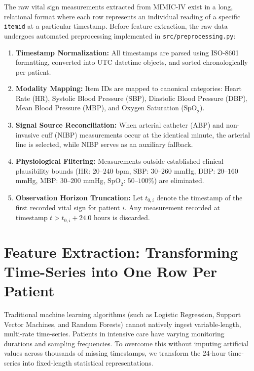 \documentclass[12pt,a4paper,oneside]{report}
\begin{document}
The raw vital sign measurements extracted from MIMIC-IV exist in a long, relational format where each row represents an individual reading of a specific \texttt{itemid} at a particular timestamp. Before feature extraction, the raw data undergoes automated preprocessing implemented in \texttt{src/preprocessing.py}:

\begin{enumerate}
    \item \textbf{Timestamp Normalization:} All timestamps are parsed using ISO-8601 formatting, converted into UTC datetime objects, and sorted chronologically per patient.
    \item \textbf{Modality Mapping:} Item IDs are mapped to canonical categories: Heart Rate (HR), Systolic Blood Pressure (SBP), Diastolic Blood Pressure (DBP), Mean Blood Pressure (MBP), and Oxygen Saturation ($\text{SpO}_2$).
    \item \textbf{Signal Source Reconciliation:} When arterial catheter (ABP) and non-invasive cuff (NIBP) measurements occur at the identical minute, the arterial line is selected, while NIBP serves as an auxiliary fallback.
    \item \textbf{Physiological Filtering:} Measurements outside established clinical plausibility bounds (HR: $20$--$240$ bpm, SBP: $30$--$260$ mmHg, DBP: $20$--$160$ mmHg, MBP: $30$--$200$ mmHg, $\text{SpO}_2$: $50$--$100$\%) are eliminated.
    \item \textbf{Observation Horizon Truncation:} Let $t_{0, i}$ denote the timestamp of the first recorded vital sign for patient $i$. Any measurement recorded at timestamp $t > t_{0, i} + 24.0\text{ hours}$ is discarded.
\end{enumerate}

\section{Feature Extraction: Transforming Time-Series into One Row Per Patient}
\label{sec:feature_engineering}

Traditional machine learning algorithms (such as Logistic Regression, Support Vector Machines, and Random Forests) cannot natively ingest variable-length, multi-rate time-series. Patients in intensive care have varying monitoring durations and sampling frequencies. To overcome this without imputing artificial values across thousands of missing timestamps, we transform the 24-hour time-series into fixed-length statistical representations.
\end{document}
